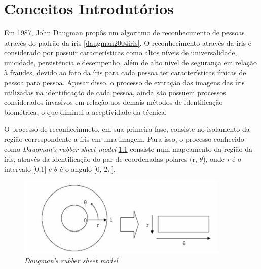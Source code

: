\chapter{Conceitos Introdutórios}\label{cap:introducao}

Em 1987, John Daugman propôs um algoritmo de reconhecimento de pessoas através do padrão da íris \ref{daugman2004iris}. O reconhecimento através da íris é considerado por possuir características como altos níveis de universalidade, unicidade, persistência e desempenho, além de alto nível de segurança em relação à fraudes, devido ao fato da íris para cada pessoa ter características únicas de pessoa para pessoa. 
Apesar disso, o processo de extração das imagens das íris utilizadas na identificação de cada pessoa, ainda são possuem processos considerados invasivos em relação aos demais métodos de identificação biométrica, o que diminui a aceptividade da técnica. 

O processo de reconhecimneto, em sua primeira fase, consiste no isolamento da região correspondente a íris em uma imagem. Para isso, o processo conhecido como \textit{Daugman's rubber sheet model} \ref{fig:daugman} consiste num mapeamento da região da íris, através da identificação do par de coordenadas polares (r, $\theta$), onde \textit{r} é o intervalo [0,1] e $\theta$ é o angulo [0, 2$\pi$]. 

\begin{figure}[htb]
	\caption{\label{fig:daugman}\textit{Daugman's rubber sheet model} }
	\begin{center}
		\includegraphics[width=0.90\textwidth]{img/daugman.png}
	\end{center}
\end{figure}

